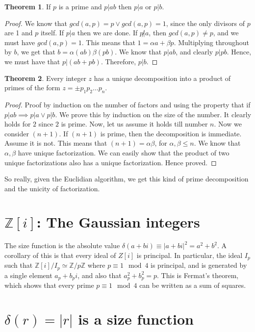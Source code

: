 \documentclass{book}
\newcommand{\Z}{\ensuremath{\mathbb{Z}}}
\theoremstyle{definition}
\newtheorem{theorem}{Theorem}
\begin{document}
\begin{theorem}
If $p$ is a prime and $p | ab$ then $p | a$ or $p | b$.
\end{theorem}
\begin{proof}
We know that $gcd(a, p) = p \lor gcd(a, p) = 1$, since the only divisors of
$p$ are 1 and $p$ itself. If $p | a$ then we are done.
If $p \not| a$, then $gcd(a, p) \neq p$, and we must have $gcd(a, p) = 1$.
This means that $1 = \alpha a + \beta p$. Multiplying throughout by $b$, 
we get that $b = \alpha (ab) \beta (pb)$. We know that $p | ab$, and clearly
$p | pb$. Hence, we must have that $p|(ab + pb)$. Therefore, $p|b$.
\end{proof}


\begin{theorem}
Every integer $z$ has a unique decomposition into a product of primes of
the form ${z = \pm p_1 p_2 \dots p_n}$.
\end{theorem}
\begin{proof}
Proof by induction on the number of factors and using the property that if
$p|ab \implies p|a \lor p|b$. We prove this by induction on the size of
the number. It clearly holds for $2$ since $2$ is prime. Now, let us assume
it holds till number $n$. Now we consider $(n+1)$. If $(n+1)$ is prime,
then the decomposition is immediate. Assume it is not. This means that
$(n+1) = \alpha \beta$, for $\alpha, \beta \leq n$. We know that $\alpha, \beta$
have unique factorization. We can easily show that the product of two unique
factorizations also has a unique factorization. Hence proved.
\end{proof}

So really, given the Euclidian algorithm, we get this kind of prime decomposition
and the unicity of factorization.

\section{$\Z[i]$: The Gaussian integers}
The size function is the absolute value $\delta(a+bi) \equiv |a+bi|^2 = a^2 + b^2$.
A corollary of this is that every ideal of $Z[i]$ is principal. In particular,
the ideal $I_p$ such that $\Z[i]/I_p \simeq \Z/p\Z$ where $p \equiv 1 \mod 4$ is
principal, and is generated by a single element $a_p + b_p i$, and also that
$a_p^2 + b_p^2 = p$. This is Fermat's theorem, which shows that every
prime $p \equiv 1 \mod 4$ can be written as a sum of squares.

\section{$\delta(r) = |r|$ is a size function}
\end{document}
